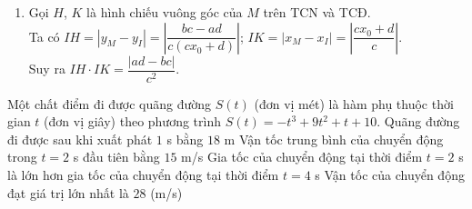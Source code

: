 \begin{bt}
{\begin{enumerate}
Suy ra $IA = |x_a - x_I| = \left |\dfrac{2(cx_0+d)}{c}\right |$; $IB =\left |\dfrac{2(bc-ad)}{c(cx_0+d)}\right |$. \\
Vậy $S_{IAB} = \dfrac{1}{2}IA \cdot IB = \dfrac{2|ad-bc|}{c^2}$.
\item Gọi $H$, $K$ là hình chiếu vuông góc của $M$ trên TCN và TCĐ. \\
Ta có $IH = |y_M-y_I| = \left |\dfrac{bc-ad}{c(cx_0+d)}\right |$; $IK = |x_M-x_I| =\left | \dfrac{cx_0+d}{c} \right |$.\\
Suy ra $IH \cdot IK = \dfrac{|ad-bc|}{c^2}$.
\end{enumerate}
}
\end{bt}

\begin{ex}%
	Một chất điểm đi được quãng đường $S(t)$ (đơn vị mét) là hàm phụ thuộc thời gian $t$ (đơn vị giây) theo phương trình $S(t)=-t^3+9 t^2+t+10$.
	\choiceTF
	{Quãng đường đi được sau khi xuất phát $1$ s bằng $18$ m}
	{\True Vận tốc trung bình của chuyển động trong $t=2$ s đầu tiên bằng $15$ m/s}
	{\True Gia tốc của chuyển động tại thời điểm $t=2$ s là lớn hơn gia tốc của chuyển động tại thời điểm $t=4$ s}
	{\True Vận tốc của chuyển động đạt giá trị lớn nhất là $28$ (m/s)}
\end{ex}

